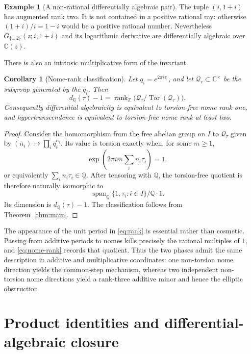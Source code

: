 \documentclass[11pt]{article}
\numberwithin{equation}{section}
\newtheorem{corollary}[theorem]{Corollary}
\theoremstyle{definition}
\newtheorem{example}[theorem]{Example}
\theoremstyle{remark}
\newcommand{\C}{\mathbb C}
\newcommand{\Q}{\mathbb Q}
\newcommand{\Z}{\mathbb Z}
\newcommand{\Span}{\operatorname{span}}
\newcommand{\Tor}{\operatorname{Tor}}
\begin{document}
\begin{example}[A non-rational differentially algebraic pair]
\label{ex:exception}
The tuple $(i,1+i)$ has augmented rank two.  It is not contained in a
positive rational ray: otherwise $(1+i)/i=1-i$ would be a positive rational
number.  Nevertheless $G_{\{1,2\}}(z;i,1+i)$ and its logarithmic derivative
are differentially algebraic over $\C(z)$.
\end{example}

There is also an intrinsic multiplicative form of the invariant.

\begin{corollary}[Nome-rank classification]
\label{cor:nome}
Let $q_i=e^{2\pi i\tau_i}$, and let $\mathcal Q_\tau\subset\C^\times$ be the
subgroup generated by the $q_i$.  Then
\begin{equation}
 d_{\Q}(\tau)-1=
 \operatorname{rank}_{\Z}\bigl(\mathcal Q_\tau/
 \Tor(\mathcal Q_\tau)\bigr).
 \label{eq:nome-rank}
\end{equation}
Consequently differential algebraicity is equivalent to torsion-free nome
rank one, and hypertranscendence is equivalent to torsion-free nome rank at
least two.
\end{corollary}

\begin{proof}
Consider the homomorphism from the free abelian group on $I$ to
$\mathcal Q_\tau$ given by $(n_i)\mapsto\prod_iq_i^{n_i}$.  Its value is
torsion exactly when, for some $m\geq1$,
\[
 \exp\left(2\pi i m\sum_i n_i\tau_i\right)=1,
\]
or equivalently $\sum_i n_i\tau_i\in\Q$.  After tensoring with $\Q$, the
torsion-free quotient is therefore naturally isomorphic to
\[
 \Span_{\Q}\{1,\tau_i:i\in I\}/\Q\cdot1.
\]
Its dimension is $d_{\Q}(\tau)-1$.  The classification follows from
Theorem~\ref{thm:main}.
\end{proof}

The appearance of the unit period in \eqref{eq:rank} is essential rather
than cosmetic.  Passing from additive periods to nomes kills precisely the
rational multiples of $1$, and \eqref{eq:nome-rank} records that quotient.
Thus the two phases admit the same description in additive and
multiplicative coordinates: one non-torsion nome direction yields the
common-step mechanism, whereas two independent non-torsion nome directions
yield a rank-three additive minor and hence the elliptic obstruction.

\section{Product identities and differential-algebraic closure}
\label{sec:identities}
\end{document}
